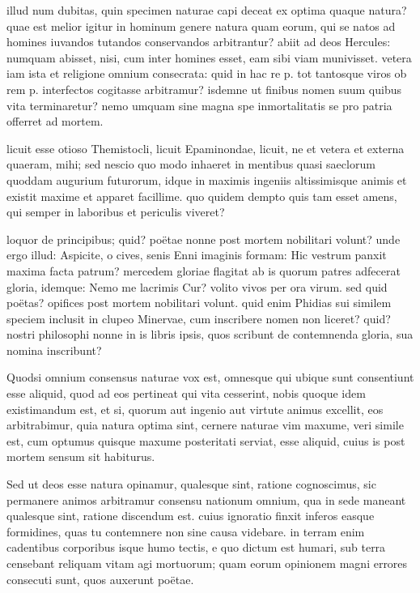  illud num dubitas, quin specimen naturae capi deceat ex optima quaque natura? quae est melior igitur in hominum genere natura quam eorum, qui se natos ad homines iuvandos tutandos conservandos arbitrantur? abiit ad deos Hercules: numquam abisset, nisi, cum inter homines esset, eam sibi viam munivisset. vetera iam ista et religione omnium consecrata: quid in hac re p. tot tantosque viros ob rem p. interfectos cogitasse arbitramur? isdemne ut finibus nomen suum quibus vita terminaretur? nemo umquam sine magna spe inmortalitatis se pro patria offerret ad mortem.

 licuit esse otioso Themistocli, licuit Epaminondae, licuit, ne et vetera et externa quaeram, mihi; sed nescio quo modo inhaeret in mentibus quasi saeclorum quoddam augurium futurorum, idque in maximis ingeniis altissimisque animis et existit maxime et apparet facillime. quo quidem dempto quis tam esset amens, qui semper in laboribus et periculis viveret?

 loquor de principibus; quid? poëtae nonne post mortem nobilitari volunt? unde ergo illud: Aspicite, o cives, senis Enni imaginis formam: Hic vestrum panxit maxima facta patrum? mercedem gloriae flagitat ab is quorum patres adfecerat gloria, idemque: Nemo me lacrimis Cur? volito vivos per ora virum. sed quid poëtas? opifices post mortem nobilitari volunt. quid enim Phidias sui similem speciem inclusit in clupeo Minervae, cum inscribere nomen non liceret? quid? nostri philosophi nonne in is libris ipsis, quos scribunt de contemnenda gloria, sua nomina inscribunt?

 Quodsi omnium consensus naturae vox est, omnesque qui ubique sunt consentiunt esse aliquid, quod ad eos pertineat qui vita cesserint, nobis quoque idem existimandum est, et si, quorum aut ingenio aut virtute animus excellit, eos arbitrabimur, quia natura optima sint, cernere naturae vim maxume, veri simile est, cum optumus quisque maxume posteritati serviat, esse aliquid, cuius is post mortem sensum sit habiturus.

 Sed ut deos esse natura opinamur, qualesque sint, ratione cognoscimus, sic permanere animos arbitramur consensu nationum omnium, qua in sede maneant qualesque sint, ratione discendum est. cuius ignoratio finxit inferos easque formidines, quas tu contemnere non sine causa videbare. in terram enim cadentibus corporibus isque humo tectis, e quo dictum est humari, sub terra censebant reliquam vitam agi mortuorum; quam eorum opinionem magni errores consecuti sunt, quos auxerunt poëtae.

